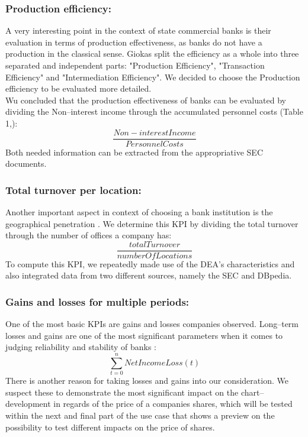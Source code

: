 \documentclass[runningheads]{llncs}
\begin{document}
\subsubsection{Production efficiency:}
A very interesting point in the context of state commercial banks is their evaluation in terms of production effectiveness, as banks do not have a production in the classical sense. Giokas \cite{Gio08} split the efficiency as a whole into three separated and independent parts: "Production Efficiency", "Transaction Efficiency" and "Intermediation Efficiency". We decided to choose the Production efficiency to be evaluated more detailed.\\
Wu concluded that the production effectiveness of banks can be evaluated by dividing the Non--interest income through the accumulated personnel costs (Table 1,\cite{Wu12}):
\begin{equation}
\frac{Non-interestIncome}{PersonnelCosts}
\end{equation}
Both needed information can be extracted from the appropriative SEC documents.
\subsubsection{Total turnover per location:}
Another important aspect in context of choosing a bank institution is the geographical penetration \cite{DeGe05}. We determine this KPI by dividing the total turnover through the number of offices a company has:
\begin{equation}
\frac{totalTurnover}{numberOfLocations}
\end{equation}
To compute this KPI, we repeatedly made use of the DEA's characteristics and also integrated data from two different sources, namely the SEC and DBpedia.
\subsubsection{Gains and losses for multiple periods:}
One of the most basic KPIs are gains and losses companies observed. Long--term losses and gains are one of the most significant parameters when it comes to judging reliability and stability of banks \cite{AlGa09}:
\begin{equation}
\sum_{t=0}^{n}NetIncomeLoss(t)
\end{equation}
There is another reason for taking losses and gains into our consideration. We suspect these to demonstrate the most significant impact on the chart--development in regards of the price of a companies shares, which will be tested within the next and final part of the use case that shows a preview on the possibility to test different impacts on the price of shares.
\end{document}
